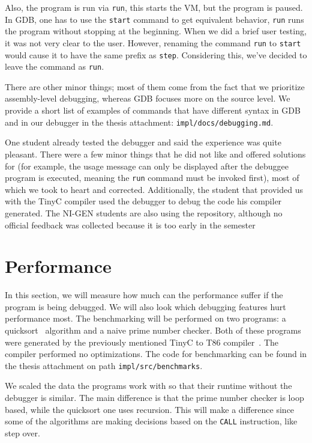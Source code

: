 Also, the program is run via \texttt{run}, this starts the VM, but the program
is paused. In GDB, one has to use the \texttt{start} command to get equivalent
behavior, \texttt{run} runs the program without stopping at the beginning. When
we did a brief user testing, it was not very clear to the user. However,
renaming the command \texttt{run} to \texttt{start} would cause it to have the
same prefix as \texttt{step}. Considering this, we've decided to leave the
command as \texttt{run}.

There are other minor things; most of them come from the fact that we
prioritize assembly-level debugging, whereas GDB focuses more on the source
level. We provide a short list of examples of commands that have different
syntax in GDB and in our debugger in the thesis attachment:
\texttt{impl/docs/debugging.md}.

One student already tested the debugger and said the experience was quite
pleasant. There were a few minor things that he did not like and offered
solutions for (for example, the usage message can only be displayed after the
debuggee program is executed, meaning the \texttt{run} command must be invoked
first), most of which we took to heart and corrected. Additionally, the student
that provided us with the TinyC compiler used the debugger to debug the code
his compiler generated. The NI-GEN students are also using the repository,
although no official feedback was collected because it is too early in the
semester

\section{Performance}\label{section:benchmark}
In this section, we will measure how much can the performance suffer if the
program is being debugged. We will also look which debugging features hurt
performance most. The benchmarking will be performed on two programs: a
quicksort~\cite{quicksort} algorithm and a naive prime number checker. Both of
these programs were generated by the previously mentioned TinyC to T86
compiler~\cite{martintinyc}. The compiler performed no optimizations. The code for
benchmarking can be found in the thesis attachment on path
\texttt{impl/src/benchmarks}.

We scaled the data the programs work with so that their runtime without the
debugger is similar. The main difference is that the prime number checker is
loop based, while the quicksort one uses recursion. This will make a difference
since some of the algorithms are making decisions based on the \texttt{CALL}
instruction, like step over.

